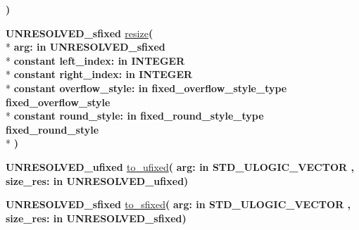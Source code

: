 \begin{DoxyCompactItemize}
{\bfseries  )} 
\item 
{\bfseries {\bfseries \textcolor{vhdlchar}{U\+N\+R\+E\+S\+O\+L\+V\+E\+D\+\_\+sfixed}\textcolor{vhdlchar}{ }}} \hyperlink{class__fixed__pkg_a53ad8e2e1b09715a3ab4fa151d798a67}{resize}{\bfseries  ( }\\*
{\bfseries \textcolor{vhdlchar}{arg\+: }\textcolor{stringliteral}{in }\textcolor{vhdlchar}{U\+N\+R\+E\+S\+O\+L\+V\+E\+D\+\_\+sfixed}}\\*
{\bfseries {\bfseries \textcolor{keywordflow}{constant}\textcolor{vhdlchar}{ }}\textcolor{vhdlchar}{left\+\_\+index\+: }\textcolor{stringliteral}{in }{\bfseries \textcolor{comment}{I\+N\+T\+E\+G\+E\+R}\textcolor{vhdlchar}{ }}}\\*
{\bfseries {\bfseries \textcolor{keywordflow}{constant}\textcolor{vhdlchar}{ }}\textcolor{vhdlchar}{right\+\_\+index\+: }\textcolor{stringliteral}{in }{\bfseries \textcolor{comment}{I\+N\+T\+E\+G\+E\+R}\textcolor{vhdlchar}{ }}}\\*
{\bfseries {\bfseries \textcolor{keywordflow}{constant}\textcolor{vhdlchar}{ }}\textcolor{vhdlchar}{overflow\+\_\+style\+: }\textcolor{stringliteral}{in }\textcolor{vhdlchar}{fixed\+\_\+overflow\+\_\+style\+\_\+type     fixed\+\_\+overflow\+\_\+style}}\\*
{\bfseries {\bfseries \textcolor{keywordflow}{constant}\textcolor{vhdlchar}{ }}\textcolor{vhdlchar}{round\+\_\+style\+: }\textcolor{stringliteral}{in }\textcolor{vhdlchar}{fixed\+\_\+round\+\_\+style\+\_\+type     fixed\+\_\+round\+\_\+style}}\\*
{\bfseries  )} 
\item 
{\bfseries {\bfseries \textcolor{vhdlchar}{U\+N\+R\+E\+S\+O\+L\+V\+E\+D\+\_\+ufixed}\textcolor{vhdlchar}{ }}} \hyperlink{class__fixed__pkg_af26dc87215f262aaa602a93f0fc9c123}{to\+\_\+ufixed}{\bfseries  ( }{\bfseries \textcolor{vhdlchar}{arg\+: }\textcolor{stringliteral}{in }{\bfseries \textcolor{comment}{S\+T\+D\+\_\+\+U\+L\+O\+G\+I\+C\+\_\+\+V\+E\+C\+T\+O\+R}\textcolor{vhdlchar}{ }}}{\bfseries  , \textcolor{vhdlchar}{size\+\_\+res\+: }\textcolor{stringliteral}{in }\textcolor{vhdlchar}{U\+N\+R\+E\+S\+O\+L\+V\+E\+D\+\_\+ufixed}}{\bfseries  )} 
\item 
{\bfseries {\bfseries \textcolor{vhdlchar}{U\+N\+R\+E\+S\+O\+L\+V\+E\+D\+\_\+sfixed}\textcolor{vhdlchar}{ }}} \hyperlink{class__fixed__pkg_acef6c4472059ccc60871f4189787d202}{to\+\_\+sfixed}{\bfseries  ( }{\bfseries \textcolor{vhdlchar}{arg\+: }\textcolor{stringliteral}{in }{\bfseries \textcolor{comment}{S\+T\+D\+\_\+\+U\+L\+O\+G\+I\+C\+\_\+\+V\+E\+C\+T\+O\+R}\textcolor{vhdlchar}{ }}}{\bfseries  , \textcolor{vhdlchar}{size\+\_\+res\+: }\textcolor{stringliteral}{in }\textcolor{vhdlchar}{U\+N\+R\+E\+S\+O\+L\+V\+E\+D\+\_\+sfixed}}{\bfseries  )} 

\end{DoxyCompactItemize}
